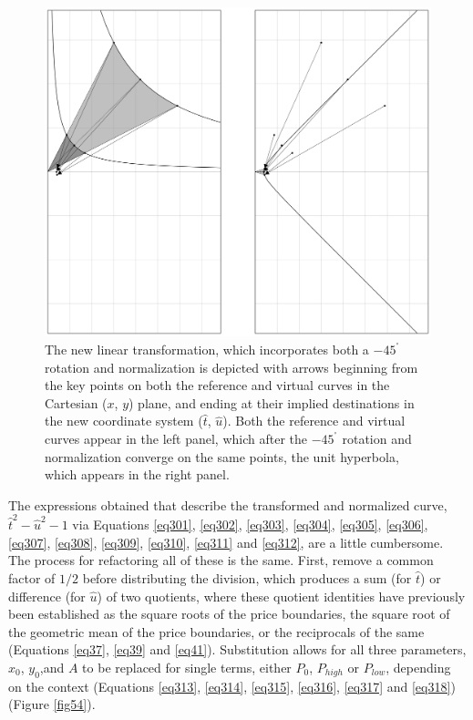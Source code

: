 \documentclass{article}
\begin{document}
\begin{figure}[ht]
    \centering
    \includegraphics[width=\textwidth]{fig53.png}
    \captionsetup{
        justification=raggedright,
        singlelinecheck=false,
        font=small,
        labelfont=bf,
        labelsep=quad,
        format=plain
    }
    \caption{The new linear transformation, which incorporates both a ${- 45}^{{^\circ}}$ rotation and normalization is depicted with arrows beginning from the key points on both the reference and virtual curves in the Cartesian ($x$, $y$) plane, and ending at their implied destinations in the new coordinate system ($\hat{t}$, $\hat{u}$). Both the reference and virtual curves appear in the left panel, which after the ${- 45}^{{^\circ}}$ rotation and normalization converge on the same points, the unit hyperbola, which appears in the right panel.}
    \label{fig53}
\end{figure}

The expressions obtained that describe the transformed and normalized curve, $\hat{t}^{2} - \hat{u}^{2} - 1$ via Equations \ref{eq301}, \ref{eq302}, \ref{eq303}, \ref{eq304}, \ref{eq305}, \ref{eq306}, \ref{eq307}, \ref{eq308}, \ref{eq309}, \ref{eq310}, \ref{eq311} and \ref{eq312}, are a little cumbersome. The process for refactoring all of these is the same. First, remove a common factor of $1 / 2$ before distributing the division, which produces a sum (for $\hat{t}$) or difference (for $\hat{u}$) of two quotients, where these quotient identities have previously been established as the square roots of the price boundaries, the square root of the geometric mean of the price boundaries, or the reciprocals of the same (Equations \ref{eq37}, \ref{eq39} and \ref{eq41}). Substitution allows for all three parameters, $x_{0}$, $y_{0}$,and $A$ to be replaced for single terms, either $P_{0}$, $P_{high}$ or $P_{low}$, depending on the context (Equations \ref{eq313}, \ref{eq314}, \ref{eq315}, \ref{eq316}, \ref{eq317} and \ref{eq318}) (Figure \ref{fig54}). 
\end{document}
